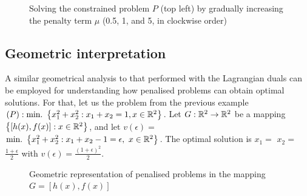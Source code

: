 \begin{figure}[H]
\caption{Solving the constrained problem $P$ (top left) by gradually increasing the penalty term $\mu$ (0.5, 1, and 5, in clockwise order)} \label{ex1}
\end{figure}


\subsection{Geometric interpretation}


A similar geometrical analysis to that performed with the Lagrangian duals can be employed for understanding how penalised problems can obtain optimal solutions. For that, let us the problem from the previous example $(P) : \mathop{\text{min.~}}\left\{ x_1^2 + x_2^2 : x_1 + x_2 = 1, x \in \mathbb{R}^2 \right \}$. Let $G: \mathbb{R}^2 \rightarrow \mathbb{R}^2$ be a mapping $\left\{ [h(x), f(x)]: x \in \mathbb{R}^2 \right \}$, and let $v(\epsilon) =$ $\mathop{\text{min.~}}\left\{ x_1^2 + x_2^2 : x_1 + x_2 - 1 = \epsilon, \ x \in \mathbb{R}^2 \right \}$. The optimal solution is $x_1 = $ $x_2 =$ $\frac{1+ \epsilon}{2}$ with $v(\epsilon) = \frac{(1+\epsilon)^2}{2}$. 

\begin{figure}
	\caption{Geometric representation of penalised problems in the mapping $G = [h(x), f(x)]$} \label{fig:Fig1}
\end{figure}

